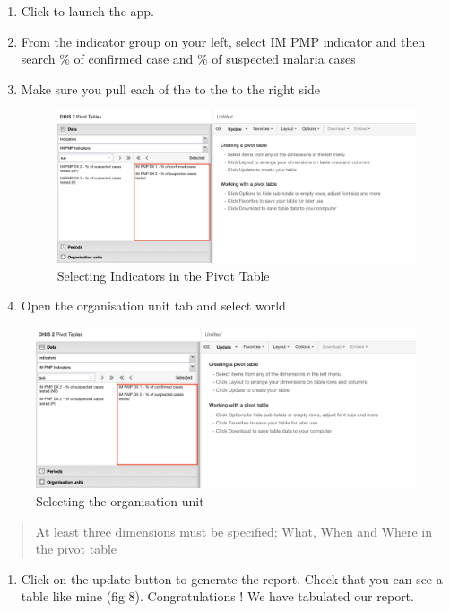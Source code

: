 \documentclass[]{book}
\providecommand{\tightlist}{%
  \setlength{\itemsep}{0pt}\setlength{\parskip}{0pt}}
\begin{document}
\begin{enumerate}
\def\labelenumi{\arabic{enumi}.}
\setcounter{enumi}{2}
\item
  Click to launch the app.
\item
  From the indicator group on your left, select IM PMP indicator and then search \% of confirmed case and \% of suspected malaria cases
\item
  Make sure you pull each of the to the to the right side

  \begin{figure}
  \includegraphics[width=27.64in]{./images/pivot-table2} \caption{Selecting Indicators in the Pivot Table}\label{fig:pivot-table2}
  \end{figure}
\item
  Open the organisation unit tab and select world
\end{enumerate}

\begin{figure}
\includegraphics[width=27.64in]{./images/pivot-table2} \caption{Selecting the organisation unit}\label{fig:pivot-table4}
\end{figure}

\begin{quote}
At least three dimensions must be specified; What, When and Where in the pivot table
\end{quote}

\begin{enumerate}
\def\labelenumi{\arabic{enumi}.}
\setcounter{enumi}{6}
\tightlist
\item
  Click on the update button to generate the report. Check that you can see a table like mine (fig 8). Congratulations ! We have tabulated our report.
\end{enumerate}
\end{document}
